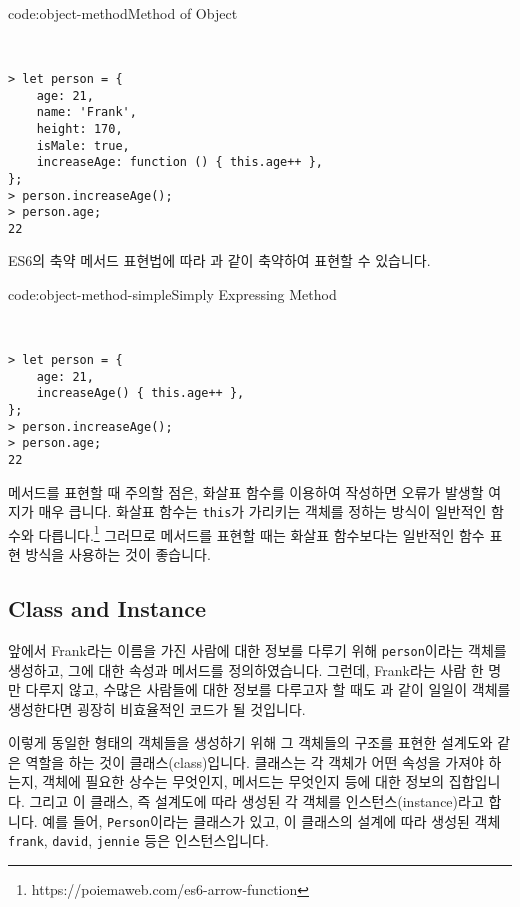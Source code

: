 \begin{codeenv}{code:object-method}{Method of Object}\begin{verbatim}


> let person = {
    age: 21,
    name: 'Frank',
    height: 170,
    isMale: true,
    increaseAge: function () { this.age++ },
};
> person.increaseAge();
> person.age;
22
\end{verbatim}
\end{codeenv}

ES6의 축약 메서드 표현법에 따라 과 같이 축약하여 표현할 수 있습니다. 

\begin{codeenv}{code:object-method-simple}{Simply Expressing Method}\begin{verbatim}


> let person = {
    age: 21,
    increaseAge() { this.age++ },
};
> person.increaseAge();
> person.age;
22
\end{verbatim}
\end{codeenv}

메서드를 표현할 때 주의할 점은, 화살표 함수를 이용하여 작성하면 오류가 발생할 여지가 매우 큽니다. 화살표 함수는 \texttt{this}가 가리키는 객체를 정하는 방식이 일반적인 함수와 다릅니다.\footnote{https://poiemaweb.com/es6-arrow-function} 그러므로 메서드를 표현할 때는 화살표 함수보다는 일반적인 함수 표현 방식을 사용하는 것이 좋습니다.

\subsection*{Class and Instance}

앞에서 Frank라는 이름을 가진 사람에 대한 정보를 다루기 위해 \texttt{person}이라는 객체를 생성하고, 그에 대한 속성과 메서드를 정의하였습니다. 그런데, Frank라는 사람 한 명만 다루지 않고, 수많은 사람들에 대한 정보를 다루고자 할 때도 과 같이 일일이 객체를 생성한다면 굉장히 비효율적인 코드가 될 것입니다. 

이렇게 동일한 형태의 객체들을 생성하기 위해 그 객체들의 구조를 표현한 설계도와 같은 역할을 하는 것이 클래스(class)입니다. 클래스는 각 객체가 어떤 속성을 가져야 하는지, 객체에 필요한 상수는 무엇인지, 메서드는 무엇인지 등에 대한 정보의 집합입니다. 그리고 이 클래스, 즉 설계도에 따라 생성된 각 객체를 인스턴스(instance)라고 합니다. 예를 들어, \texttt{Person}이라는 클래스가 있고, 이 클래스의 설계에 따라 생성된 객체 \texttt{frank}, \texttt{david}, \texttt{jennie} 등은 인스턴스입니다. 

